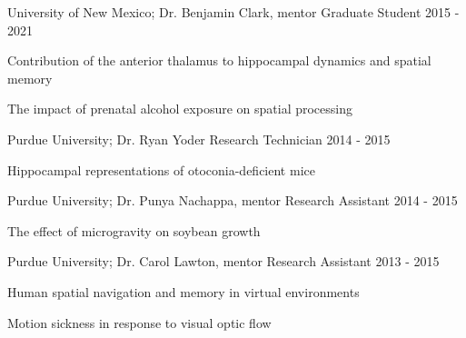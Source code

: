 

\begin{cventries}

  \cventry
    {University of New Mexico; Dr. Benjamin Clark, mentor} %
    {Graduate Student} %
    {} %
    {2015 - 2021} %
    {
      \begin{cvitems} %
        \item {Contribution of the anterior thalamus to hippocampal dynamics and spatial memory}
        \item {The impact of prenatal alcohol exposure on spatial processing}
      \end{cvitems}
    }

  \cventry
    {Purdue University; Dr. Ryan Yoder} %
    {Research Technician} %
    {} %
    {2014 - 2015} %
    {
      \begin{cvitems} %
        \item {Hippocampal representations of otoconia-deficient mice}
      \end{cvitems}
    }
    
   \cventry
    {Purdue University; Dr. Punya Nachappa, mentor} %
    {Research Assistant} %
    {} %
    {2014 - 2015} %
    {
      \begin{cvitems} %
        \item {The effect of microgravity on soybean growth}
      \end{cvitems}
    }
    
  \cventry
    {Purdue University; Dr. Carol Lawton, mentor} %
    {Research Assistant} %
    {} %
    {2013 - 2015} %
    {
      \begin{cvitems} %
        \item {Human spatial navigation and memory in virtual environments}
        \item {Motion sickness in response to visual optic flow}
      \end{cvitems}
    }    
    

\end{cventries}
